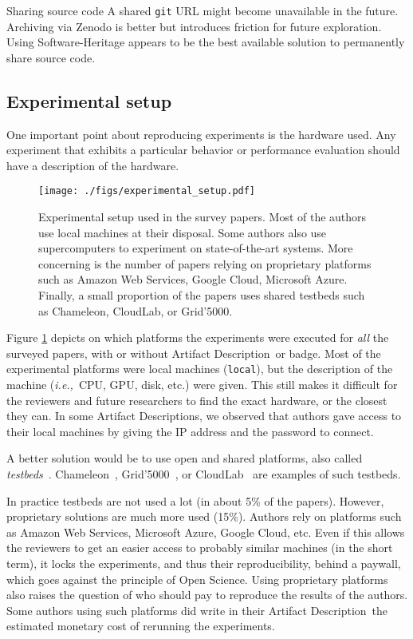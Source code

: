 \documentclass[sigconf,natbib=false]{acmart}
\newcommand{\ie}{\emph{i.e.,}}
\newcommand{\ad}{Artifact Description}
\begin{document}
\begin{lesson}{Sharing source code}{}
  A shared \texttt{git} URL might become unavailable in the future.
  Archiving via Zenodo is better but introduces friction for future exploration.
  Using Software-Heritage appears to be the best available solution to permanently share source code.
\end{lesson}

\subsection{Experimental setup}\label{sec:sop:expe}

One important point about reproducing experiments is the hardware used.
Any experiment that exhibits a particular behavior or performance evaluation should have a description of the hardware. 

\begin{figure}
  \centering
  \texttt{[image: ./figs/experimental\_setup.pdf]}
  \caption{Experimental setup used in the survey papers. Most of the authors use local machines at their disposal. Some authors also use supercomputers to experiment on state-of-the-art systems. More concerning is the number of papers relying on proprietary platforms such as Amazon Web Services, Google Cloud, Microsoft Azure. Finally, a small proportion of the papers uses shared testbeds such as Chameleon, CloudLab, or Grid'5000.}\label{fig:experimental_setup}
\end{figure}

Figure \ref{fig:experimental_setup} depicts on which platforms the experiments were executed for \emph{all} the surveyed papers, with or without \ad\ or badge.
Most of the experimental platforms were local machines (\texttt{local}), but the description of the machine (\ie\ CPU, GPU, disk, etc.) were given.
This still makes it difficult for the reviewers and future researchers to find the exact hardware, or the closest they can.
In some \ad s, we observed that authors gave access to their local machines by giving the IP address and the password to connect.

A better solution would be to use open and shared platforms, also called \emph{testbeds}\ \cite{nussbaum2017testbeds}.
Chameleon\ \cite{chameleon}, Grid'5000\ \cite{grid5000}, or CloudLab\ \cite{cloudlab} are examples of such testbeds.

In practice testbeds are not used a lot (in about 5\% of the papers).
However, proprietary solutions are much more used (15\%).
Authors rely on platforms such as Amazon Web Services, Microsoft Azure, Google Cloud, etc.
Even if this allows the reviewers to get an easier access to probably similar machines (in the short term), it locks the experiments, and thus their reproducibility, behind a paywall, which goes against the principle of Open Science.
Using proprietary platforms also raises the question of who should pay to reproduce the results of the authors.
Some authors using such platforms did write in their \ad\ the estimated monetary cost of rerunning the experiments.
\end{document}
